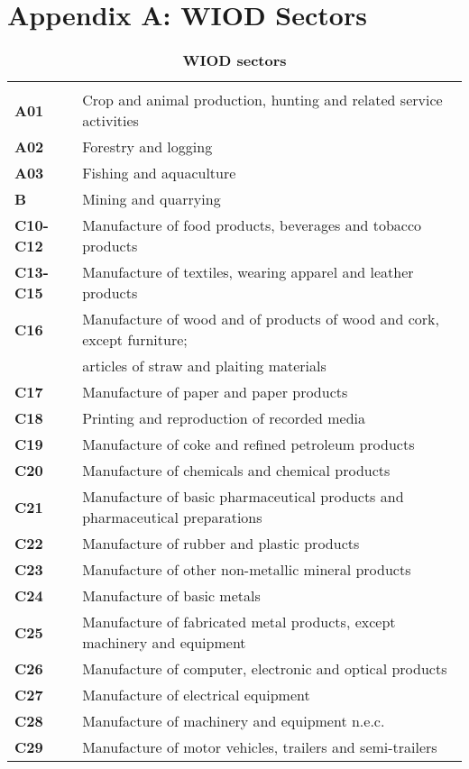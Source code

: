 \documentclass[11pt,a4paper]{article} %
\begin{document}
\section*{Appendix A: WIOD Sectors}
\begin{table}[H]
 \centering
 \caption{\footnotesize{\textbf{WIOD sectors}}}
 \footnotesize
 \begin{tabular}{ll}
  \hline \\
\textbf{A01} &{Crop and animal production, hunting and related service activities}\\
\textbf{A02} &{Forestry and logging}\\
\textbf{A03} &{Fishing and aquaculture}\\
\textbf{B} &{Mining and quarrying}\\
\textbf{C10-C12} &{Manufacture of food products, beverages and tobacco products}\\
\textbf{C13-C15} &{Manufacture of textiles, wearing apparel and leather products}\\
\textbf{C16} &{Manufacture of wood and of products of wood and cork, except furniture;} \\
 & {articles of straw and plaiting materials}\\
\textbf{C17} &{Manufacture of paper and paper products}\\
\textbf{C18} &{Printing and reproduction of recorded media}\\
\textbf{C19} &{Manufacture of coke and refined petroleum products}\\
\textbf{C20} &{Manufacture of chemicals and chemical products}\\
\textbf{C21} &{Manufacture of basic pharmaceutical products and pharmaceutical preparations}\\
\textbf{C22} &{Manufacture of rubber and plastic products}\\
\textbf{C23} &{Manufacture of other non-metallic mineral products}\\
\textbf{C24} &{Manufacture of basic metals}\\
\textbf{C25} &{Manufacture of fabricated metal products, except machinery and equipment}\\
\textbf{C26} &{Manufacture of computer, electronic and optical products}\\
\textbf{C27} &{Manufacture of electrical equipment}\\
\textbf{C28} &{Manufacture of machinery and equipment n.e.c.}\\
\textbf{C29} &{Manufacture of motor vehicles, trailers and semi-trailers}\\

\end{tabular}
\end{table}
\end{document}
